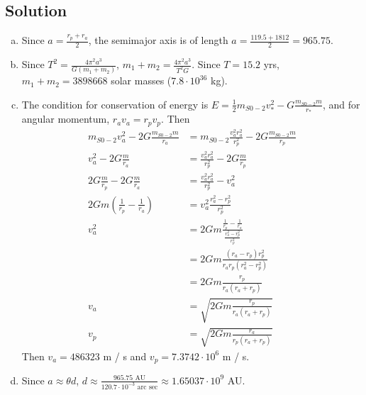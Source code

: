 \documentclass[solutions]{esg8012pset}
\begin{document}
\subsection{Solution}
\begin{enumerate}[(a)]
  \item Since $a = \frac{r_p + r_a}{2}$, the semimajor axis is of length $a = \frac{119.5 + 1812}{2} = 965.75$.
  \item Since $T^2 = \frac{4\pi^2 a^3}{G(m_1 + m_2)}$, $m_1 + m_2 = \frac{4\pi^2 a^3}{T^2 G}$.  Since $T = 15.2$ yrs, $m_1 + m_2 = 3898668$ solar masses ($7.8 \cdot 10^{36}$ kg).
  \item The condition for conservation of energy is $E = \frac12 m_{S0-2} v_*^2 - G\frac{m_{S0-2} m}{r_*}$, and for angular momentum, $r_a v_a = r_p v_p$.  Then \begin{align*}
 m_{S0-2} v_a^2 - 2G\frac{m_{S0-2} m}{r_a} & = m_{S0-2} \frac{v_a^2 r_a^2}{r_p^2} - 2G\frac{m_{S0-2} m}{r_p} \\
 v_a^2 - 2G\frac{m}{r_a} & = \frac{v_a^2 r_a^2}{r_p^2} - 2G\frac{m}{r_p} \\
 2G\frac{m}{r_p} - 2G\frac{m}{r_a} & = \frac{v_a^2 r_a^2}{r_p^2} - v_a^2 \\
 2G m \left(\frac{1}{r_p} - \frac{1}{r_a}\right) & = v_a^2\frac{r_a^2 - r_p^2}{r_p^2} \\
 v_a^2 & = 2G m \frac{\frac{1}{r_p} - \frac{1}{r_a}}{\frac{r_a^2 - r_p^2}{r_p^2}} \\
  & = 2G m \frac{(r_a - r_p) r_p^2}{r_a r_p(r_a^2 - r_p^2)} \\
  & = 2G m \frac{r_p}{r_a (r_a + r_p)} \\
 v_a & = \sqrt{2G m \frac{r_p}{r_a (r_a + r_p)}} \\
 v_p & = \sqrt{2G m \frac{r_a}{r_p (r_a + r_p)}}
\end{align*}
  Then $v_a = 486323$ m / s and $v_p = 7.3742\cdot 10^6$ m / s.
  \item Since $a \approx \theta d$, $d \approx \frac{965.75\text{ AU}}{120.7\cdot 10^{-3}\text{ arc sec}}\approx 1.65037\cdot 10^9$ AU.
\end{enumerate}
\end{document}
